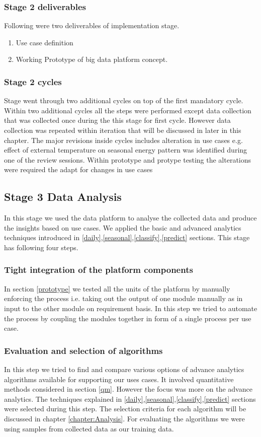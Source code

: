 \subsubsection{Stage 2 deliverables}
Following were two deliverables of implementation stage.
\begin{enumerate}
\item Use case definition
\item Working Prototype of big data platform concept.
\end{enumerate}
\subsubsection{Stage 2 cycles}
Stage went through two additional cycles on top of the first mandatory cycle. Within two additional cycles all the steps were performed except data collection that was collected once during the this stage for first cycle. However data collection was repeated within iteration that will be discussed in later in this chapter.
The major revisions inside cycles includes alteration in use cases e.g. effect of external temperature on seasonal energy pattern was identified during one of the review sessions. Within prototype and protype testing the alterations were required the adapt for changes in use cases

\subsection{Stage 3 Data Analysis}
In this stage we used the data platform to analyse the collected data and produce the insights based on use cases. We applied the basic and advanced analytics techniques introduced in \ref{daily},\ref{seasonal},\ref{classify},\ref{predict} sections. This stage has following four steps.
\subsubsection{Tight integration of the platform components}
In section \ref{prototype} we tested all the units of the platform by manually enforcing the process i.e. taking out the  output of one module manually as in input to the other module on requirement basis. In this step we tried to automate the process by coupling the modules together in form of a single process per use case. 
\subsubsection{Evaluation and selection of algorithms}\label{eval}
In this step we tried to find and compare various options of advance analytics algorithms available for supporting our uses cases. It involved quantitative methods considered in section \ref{qm}. However the focus was more on the advance analytics. The techniques explained in \ref{daily},\ref{seasonal},\ref{classify},\ref{predict} sections were selected during this step. The selection criteria for each algorithm will be discussed in chapter \ref{chapter:Analysis}. For evaluating the algorithms we were using samples from collected data as our training data. 
